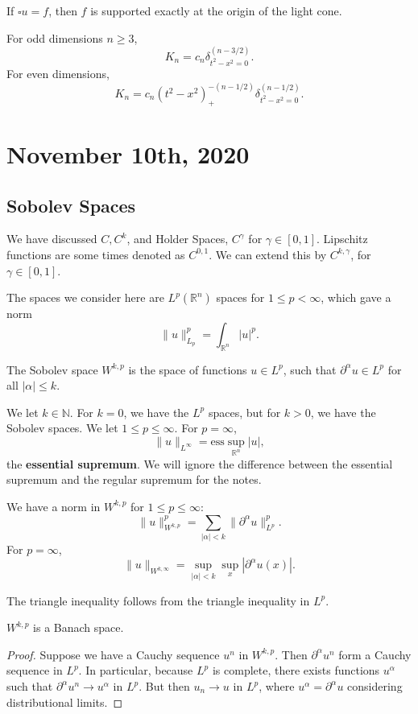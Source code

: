 \documentclass[12pt]{scrartcl}
\newcommand{\N}{\mathbb{N}}
\newcommand{\R}{\mathbb{R}}
\begin{document}
\begin{corollary} If $\square u = f$, then $f$ is supported exactly at the origin of the light cone.
\end{corollary}

For odd dimensions $n \ge 3$, 
$$K_n = c_n \delta_{t^2 - x^2 = 0}^{(n-3/2)}.$$
For even dimensions,
$$K_n = c_n (t^2 - x^2)_+^{-(n-1/2)} \delta_{t^2 - x^2 = 0}^{(n-1/2)}.$$

\pagebreak
\section{November 10th, 2020}
\subsection{Sobolev Spaces}
We have discussed $C, C^k$, and Holder Spaces, $C^\gamma$ for $\gamma \in [0, 1]$.  Lipschitz functions are some times denoted as $C^{0, 1}$.  We can extend this by $C^{k, \gamma}$, for $\gamma \in [0, 1]$.  

The spaces we consider here are $L^p(\R^n)$ spaces for $1 \le p < \infty$, which gave a norm $$\|u\|_{L_p}^p = \int_{\R^n}|u|^p.$$

\begin{definition} The Sobolev space $W^{k, p}$ is the space of functions $u \in L^p$, such that $\partial^\alpha u \in L^p$ for all $|\alpha| \le k$.
\end{definition}
We let $k \in \N$.  For $k = 0$, we have the $L^p$ spaces, but for $k > 0$, we have the Sobolev spaces.  We let $1 \le p \le \infty$.  For $p = \infty$,
$$\|u\|_{L^\infty} = \text{ess}\sup_{\R^n} |u|,$$
the \textbf{essential supremum}.  We will ignore the difference between the essential supremum and the regular supremum for the notes.

\begin{proposition} We have a norm in $W^{k, p}$ for $1 \le p \le \infty$:
$$\|u\|_{W^{k, p}}^p = \sum_{|\alpha| < k} \|\partial^\alpha u\|_{L^p}^p.$$
For $p = \infty$,
$$\|u\|_{W^{k, \infty}} = \sup_{|\alpha| < k} \sup_x |\partial^\alpha u(x)|.$$
\end{proposition}
\begin{remark} The triangle inequality follows from the triangle inequality in $L^p$.
\end{remark}

\begin{proposition} $W^{k, p}$ is a Banach space.
\end{proposition}
\begin{proof}
Suppose we have a Cauchy sequence $u^n$ in $W^{k, p}$.  Then $\partial^\alpha u^n$ form a Cauchy sequence in $L^p$.  In particular, because $L^p$ is complete, there exists functions $u^\alpha$ such that $\partial^\alpha u^n \to u^\alpha$ in $L^p$.  But then $u_n \to u$ in $L^p$, where $u^\alpha= \partial^\alpha u$ considering distributional limits.  
\end{proof}
\end{document}
